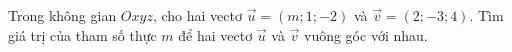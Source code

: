 \begin{ex}
Trong không gian $Oxyz$, cho hai vectơ $\vec{u}=(m;1;-2)$ và $\vec{v}=(2;-3;4)$. Tìm giá trị của tham số thực $m$ để hai vectơ $\vec{u}$ và $\vec{v}$ vuông góc với nhau.
\end{ex}
